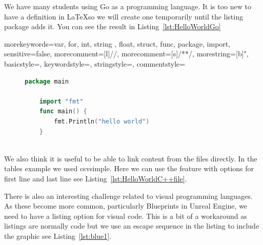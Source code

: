 We have many students using Go as a programming language.  It is too new to have a definition in \LaTeX so we will create one temporarily until the listing package adds it. You can see the result in Listing~\ref{lst:HelloWorldGo}

    {   morekeywords={var, for, int, string , float, struct, func, package, import},
        sensitive=false,
        morecomment=[l]{//},
        morecomment=[s]{/*}{*/},
        morestring=[b]",
        basicstyle=\ttfamily,
        keywordstyle=\color{red}\ttfamily,
        stringstyle=\color{darkgreen}\ttfamily,
        commentstyle=\color{blue}\ttfamily
    }


\begin{figure}
\begin{lstlisting}[language=go, caption={Go code for hello world}, label={lst:HelloWorldGo}]
    package main

    import "fmt"
    func main() {
        fmt.Println("hello world")
    }
    
\end{lstlisting}
\end{figure}



We also think it is useful to be able to link content from the files directly.  In the tables example we used csvsimple.  Here we can use the feature \lstinline{} with options for first line and last line see Listing~\ref{lst:HelloWorldC++file}.



There is also an interesting challenge related to visual programming languages.  As these become more common, particularly Blueprints in Unreal Engine, we need to have a listing option for visual code.  This is a bit of a workaround as listings are normally code but we use an escape sequence in the listing to include the graphic see Listing~\ref{lst:blue1}.



